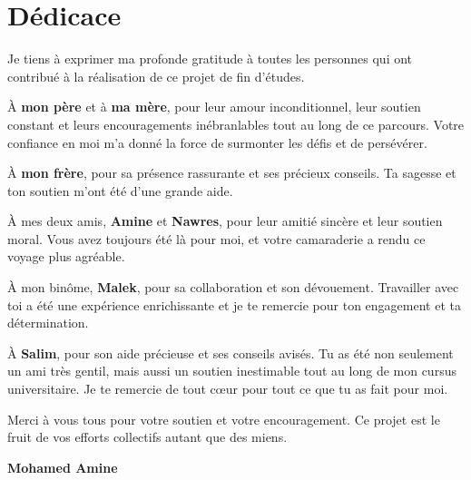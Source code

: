 \thispagestyle{empty}

\chapter*{Dédicace}

Je tiens à exprimer ma profonde gratitude à toutes les personnes qui ont contribué à la réalisation de ce projet de fin d'études.
\vspace{1em}

À \textbf{mon père} et à \textbf{ma mère}, pour leur amour inconditionnel, leur soutien constant et leurs encouragements inébranlables tout au long de ce parcours. Votre confiance en moi m'a donné la force de surmonter les défis et de persévérer.

À \textbf{mon frère}, pour sa présence rassurante et ses précieux conseils. Ta sagesse et ton soutien m'ont été d'une grande aide.

À mes deux amis, \textbf{Amine} et \textbf{Nawres}, pour leur amitié sincère et leur soutien moral. Vous avez toujours été là pour moi, et votre camaraderie a rendu ce voyage plus agréable.

À mon binôme, \textbf{Malek}, pour sa collaboration et son dévouement. Travailler avec toi a été une expérience enrichissante et je te remercie pour ton engagement et ta détermination.

À \textbf{Salim}, pour son aide précieuse et ses conseils avisés. Tu as été non seulement un ami très gentil, mais aussi un soutien inestimable tout au long de mon cursus universitaire. Je te remercie de tout cœur pour tout ce que tu as fait pour moi.

\vspace{1em}
Merci à vous tous pour votre soutien et votre encouragement. Ce projet est le fruit de vos efforts collectifs autant que des miens.

\vfill
\hfill \textbf{Mohamed Amine}